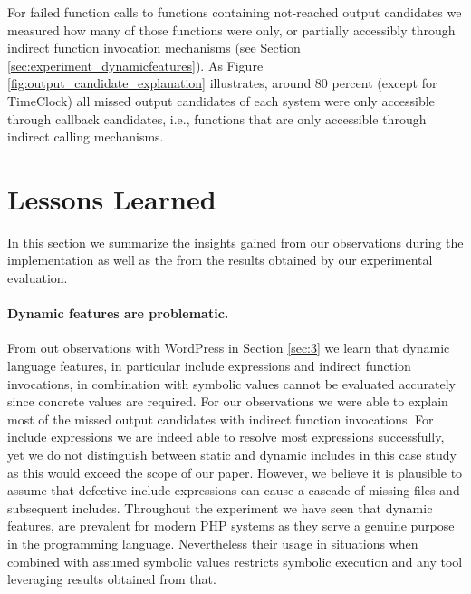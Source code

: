 \documentclass[sigconf]{acmart}
\renewcommand{\sf}[1]{\textsf{#1}}
\begin{document}

For failed function calls to functions containing not-reached output
candidates we measured how many of those functions were only, or
partially accessibly through indirect function invocation mechanisms (see
Section \ref{sec:experiment_dynamicfeatures}). As Figure
\ref{fig:output_candidate_explanation} illustrates, around 80 percent (except
for \sf{TimeClock}) all missed output candidates of each system were only
accessible through callback candidates, i.e., functions that are only
accessible through indirect calling mechanisms.

\section{Lessons Learned}
In this section we summarize the insights gained from our observations during
the implementation as well as the from the results obtained by our experimental
evaluation.

\paragraph{Dynamic features are problematic.}
From out observations with \sf{WordPress} in Section \ref{sec:3} we learn that
dynamic language features, in particular include expressions and indirect function
invocations, in combination with symbolic values cannot be evaluated accurately
since concrete values are required. For our observations we were able to explain most
of the missed output candidates with indirect function invocations. For include
expressions we are indeed able to resolve most expressions successfully, yet we
do not distinguish between static and dynamic includes in this case study as
this would exceed the scope of our paper. However, we believe it is plausible
to assume that defective include expressions can cause a cascade of missing
files and subsequent includes.
Throughout the experiment we have seen that dynamic features, are prevalent for
modern PHP systems as they serve a genuine purpose in the programming language.
Nevertheless their usage in situations when combined with assumed symbolic
values restricts symbolic execution and any tool leveraging results obtained
from that.
\end{document}
